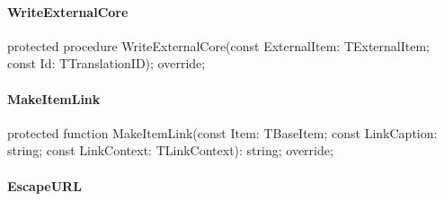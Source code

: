 \documentclass{report}
\newif\ifpdf
\begin{document}
\paragraph*{WriteExternalCore}\hspace*{\fill}

\label{PasDoc_GenHtml.TGenericHTMLDocGenerator-WriteExternalCore}
\begin{list}{}{
\setlength{\itemindent}{0cm}
\setlength{\listparindent}{0cm}
\setlength{\leftmargin}{\evensidemargin}
\addtolength{\leftmargin}{\tmplength}
\settowidth{\labelsep}{X}
\addtolength{\leftmargin}{\labelsep}
\setlength{\labelwidth}{\tmplength}
}
\item[\textbf{Declaration}\hfill]
\ifpdf
\begin{flushleft}
\fi
\begin{ttfamily}
protected procedure WriteExternalCore(const ExternalItem: TExternalItem; const Id: TTranslationID); override;\end{ttfamily}

\ifpdf
\end{flushleft}
\fi

\end{list}
\paragraph*{MakeItemLink}\hspace*{\fill}

\label{PasDoc_GenHtml.TGenericHTMLDocGenerator-MakeItemLink}
\begin{list}{}{
\setlength{\itemindent}{0cm}
\setlength{\listparindent}{0cm}
\setlength{\leftmargin}{\evensidemargin}
\addtolength{\leftmargin}{\tmplength}
\settowidth{\labelsep}{X}
\addtolength{\leftmargin}{\labelsep}
\setlength{\labelwidth}{\tmplength}
}
\item[\textbf{Declaration}\hfill]
\ifpdf
\begin{flushleft}
\fi
\begin{ttfamily}
protected function MakeItemLink(const Item: TBaseItem; const LinkCaption: string; const LinkContext: TLinkContext): string; override;\end{ttfamily}

\ifpdf
\end{flushleft}
\fi

\end{list}
\paragraph*{EscapeURL}\hspace*{\fill}
\end{document}
